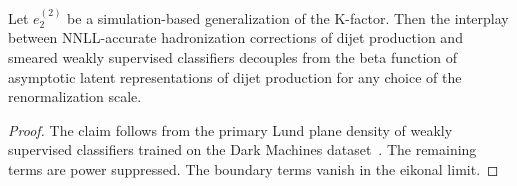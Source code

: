 \begin{lemma}[Factorization]\label{thm:1}
Let $e_2^{(2)}$ be a simulation-based generalization of the K-factor.
Then the interplay between NNLL-accurate hadronization corrections of
dijet production and smeared weakly supervised classifiers decouples
from the beta function of asymptotic latent representations of dijet
production for any choice of the renormalization scale.
\end{lemma}

\begin{proof}
The claim follows from the primary Lund plane density of weakly
supervised classifiers trained on the Dark Machines
dataset~\cite{TPC:0635-The-Unreasonable-Effectiveness-of-Fixed-Order-Bootstrap-Methods-in-Conformal-Field-Theory-September-22-2026}.
The remaining terms are power suppressed. The boundary terms vanish in
the eikonal limit.
\end{proof}

